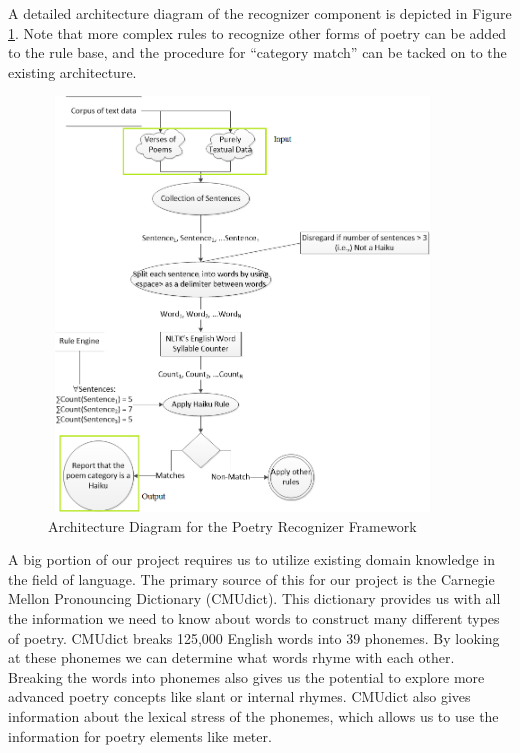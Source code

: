 \documentclass[10pt, letter,twocolumn]{IEEEtran}
\begin{document}
A detailed architecture diagram of the recognizer component is depicted in Figure \ref{architecture}. Note that more complex rules to recognize other forms of poetry can be added to the rule base, and the procedure for ``category match'' can be tacked on to the existing architecture. 
\begin{figure}[ht]
  \centering
    \includegraphics[width=10.3cm, height=11cm]{Images/arch1}
    \caption{Architecture Diagram for the Poetry Recognizer Framework}
  \label{architecture}
\end{figure}

A big portion of our project requires us to utilize existing domain knowledge in the field of language. The primary source of this for our project is the Carnegie Mellon Pronouncing Dictionary (CMUdict).  This dictionary provides us with all the information we need to know about words to construct many different types of poetry.  CMUdict breaks 125,000 English words into 39 phonemes.  By looking at these phonemes we can determine what words rhyme with each other.  Breaking the words into phonemes also gives us the potential to explore more advanced poetry concepts like slant or internal rhymes. CMUdict also gives information about the lexical stress of the phonemes, which allows us to use the information for poetry elements like meter.  
\end{document}
